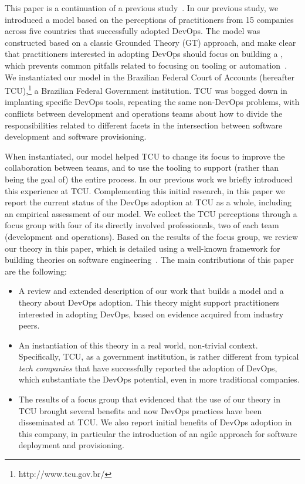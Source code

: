 This paper is a continuation of a previous study~\cite{Luz:2018:ESEM}.
In our previous study, we introduced a model based on the perceptions of practitioners from
15 companies across five countries that successfully adopted DevOps. The model
was constructed based on a classic Grounded Theory (GT) approach,
and make clear that practitioners interested in adopting DevOps should focus on building a
\cc, which prevents common pitfalls related to focusing on tooling or automation~\cite{Kromhout:2017:Queue}.
We instantiated our model in the Brazilian Federal Court of
Accounts (hereafter TCU),\footnote{http://www.tcu.gov.br/} a Brazilian Federal Government institution. TCU was
bogged down in implanting specific DevOps tools, repeating the same non-DevOps
problems, with conflicts between development and operations teams about how to
divide the responsibilities related to different facets in the intersection
between software development and software provisioning.

When instantiated,
our model helped TCU to change its focus to improve the collaboration between teams, and to use the tooling
to support (rather than being the goal of) the entire process.
In our previous work
we briefly introduced this experience at TCU.
Complementing this initial research, in this paper we report the current status
of the DevOps adoption at TCU as a whole, including an empirical assessment of our model.
We collect the TCU perceptions through a focus group with four of its directly
involved professionals, two of each team (development and operations). Based on
the results of the focus group, we review our theory in this paper, which is
detailed using a well-known framework for building theories on software engineering~\cite{sjoberg2008}.
The main contributions of this paper are the following:

\begin{itemize}
\item A review and extended description of our work that builds a model and
  a theory about DevOps adoption. This theory might support practitioners interested in adopting DevOps,
  based on evidence acquired from industry peers.

\item An instantiation of this theory in a real world, non-trivial context. Specifically, TCU,
  as a government institution, is rather different from typical \emph{tech companies} that have
  successfully reported the adoption of DevOps, which substantiate the DevOps potential, even in more traditional
  companies.

\item The results of a focus group that evidenced that the use of our theory in TCU brought several
  benefits and now DevOps practices have been disseminated at TCU. We also report initial benefits
  of DevOps adoption in this company, in particular the introduction of an agile approach for software
  deployment and provisioning.

\end{itemize}

